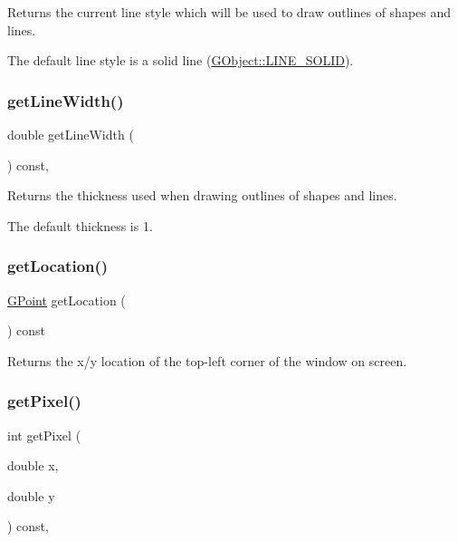 Returns the current line style which will be used to draw outlines of shapes and lines. 

The default line style is a solid line (\mbox{\hyperlink{classGObject_a86e0f5648542856159bb40775c854aa7a700c78bc2cd76acaab26651bf7b4941f}{G\+Object\+::\+L\+I\+N\+E\+\_\+\+S\+O\+L\+ID}}). \mbox{\label{classGDrawingSurface_a85ff266dc3eb63d9f2d8e5a4487fd3c0}} 
\subsubsection{\texorpdfstring{get\+Line\+Width()}{getLineWidth()}}
{\footnotesize\ttfamily double get\+Line\+Width (\begin{DoxyParamCaption}{ }\end{DoxyParamCaption}) const\hspace{0.3cm}{\ttfamily [virtual]}, {\ttfamily [inherited]}}



Returns the thickness used when drawing outlines of shapes and lines. 

The default thickness is 1. \mbox{\label{classGWindow_a4f83802015511edeb63b892830812c11}} 
\subsubsection{\texorpdfstring{get\+Location()}{getLocation()}}
{\footnotesize\ttfamily \mbox{\hyperlink{classGPoint}{G\+Point}} get\+Location (\begin{DoxyParamCaption}{ }\end{DoxyParamCaption}) const\hspace{0.3cm}{\ttfamily [virtual]}}



Returns the x/y location of the top-\/left corner of the window on screen. 

\mbox{\label{classGForwardDrawingSurface_a076754305680c65782a00ddd3c77b50b}} 
\subsubsection{\texorpdfstring{get\+Pixel()}{getPixel()}}
{\footnotesize\ttfamily int get\+Pixel (\begin{DoxyParamCaption}\item[{double}]{x,  }\item[{double}]{y }\end{DoxyParamCaption}) const\hspace{0.3cm}{\ttfamily [virtual]}, {\ttfamily [inherited]}}

